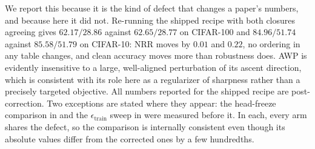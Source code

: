 \documentclass{article} %
\theoremstyle{plain}
\begin{document}
We report this because it is the kind of defect that changes a paper's numbers, and because here it
did not. Re-running the shipped recipe with both closures agreeing gives $62.17/28.86$ against
$62.65/28.77$ on CIFAR-100 and $84.96/51.74$ against $85.58/51.79$ on CIFAR-10: NRR moves by $0.01$
and $0.22$, no ordering in any table changes, and clean accuracy moves more than robustness does. AWP
is evidently insensitive to a large, well-aligned perturbation of its ascent direction, which is
consistent with its role here as a regularizer of sharpness rather than a precisely targeted objective.
All numbers reported for the shipped recipe are post-correction. Two exceptions are stated where they
appear: the head-freeze comparison in  and the
$\epsilon_{\mathrm{train}}$ sweep in  were measured before it. In each, every arm
shares the defect, so the comparison is internally consistent even though its absolute values differ
from the corrected ones by a few hundredths.




\end{document}
